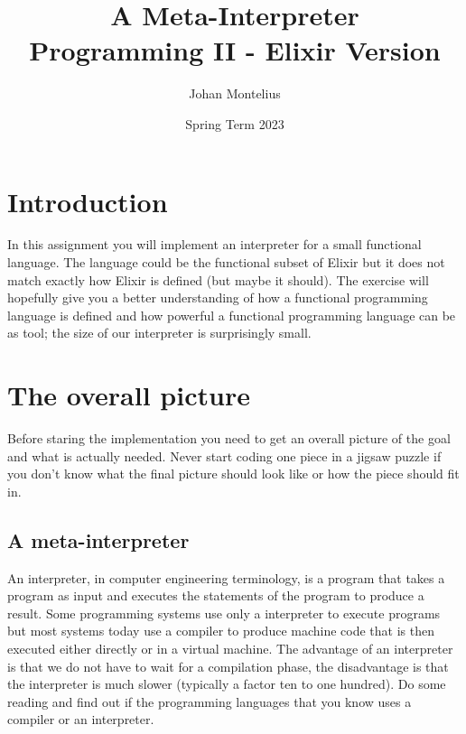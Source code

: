 \documentclass[a4paper,11pt]{article}
\begin{document}

\title{
    \textbf{A Meta-Interpreter}\\
    \large{Programming II - Elixir Version}
}
\author{Johan Montelius}
\date{Spring Term 2023}
\maketitle
{}



\section*{Introduction}

In this assignment you will implement an interpreter for a small
functional language. The language could be the functional subset of
Elixir but it does not match exactly how Elixir is defined (but maybe
it should). The exercise will hopefully give you a better
understanding of how a functional programming language is defined and
how powerful a functional programming language can be as tool; the
size of our interpreter is surprisingly small. 



\section{The overall picture}

Before staring the implementation you need to get an overall picture
of the goal and what is actually needed. Never start coding one piece
in a jigsaw puzzle if you don't know what the final picture should look
like or how the piece should fit in.

\subsection{A meta-interpreter}
An interpreter, in computer engineering terminology, is a program that
takes a program as input and executes the statements of the program to
produce a result. Some programming systems use only a interpreter to
execute programs but most systems today use a compiler to produce
machine code that is then executed either directly or in a
virtual machine. The advantage of an interpreter is that we do not
have to wait for a compilation phase, the disadvantage is that the
interpreter is much slower (typically a factor ten to one hundred).
Do some reading and find out if the programming languages that you
know uses a compiler or an interpreter.
\end{document}
